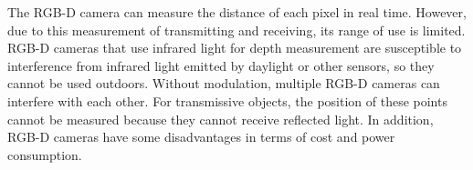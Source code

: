 The RGB-D camera can measure the distance of each pixel in real time. However, due to this measurement of transmitting and receiving, its range of use is limited. RGB-D cameras that use infrared light for depth measurement are susceptible to interference from infrared light emitted by daylight or other sensors, so they cannot be used outdoors. Without modulation, multiple RGB-D cameras can interfere with each other. For transmissive objects, the position of these points cannot be measured because they cannot receive reflected light. In addition, RGB-D cameras have some disadvantages in terms of cost and power consumption.

